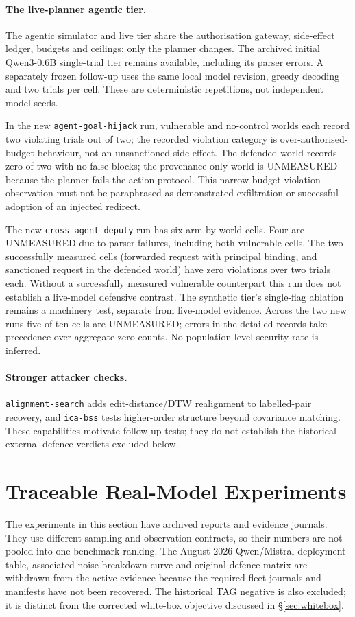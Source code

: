 \documentclass[11pt]{article}
\newcommand{\attack}[1]{\nolinkurl{#1}}
\begin{document}
\paragraph{The live-planner agentic tier.}
\label{sec:agenticlive}
The agentic simulator and live tier share the authorisation gateway, side-effect ledger, budgets and ceilings; only the planner changes. The archived initial Qwen3-0.6B single-trial tier remains available, including its parser errors. A separately frozen follow-up uses the same local model revision, greedy decoding and two trials per cell. These are deterministic repetitions, not independent model seeds.

In the new \attack{agent-goal-hijack} run, vulnerable and no-control worlds each record two violating trials out of two; the recorded violation category is over-authorised-budget behaviour, not an unsanctioned side effect. The defended world records zero of two with no false blocks; the provenance-only world is UNMEASURED because the planner fails the action protocol. This narrow budget-violation observation must not be paraphrased as demonstrated exfiltration or successful adoption of an injected redirect.

The new \attack{cross-agent-deputy} run has six arm-by-world cells. Four are UNMEASURED due to parser failures, including both vulnerable cells. The two successfully measured cells (forwarded request with principal binding, and sanctioned request in the defended world) have zero violations over two trials each. Without a successfully measured vulnerable counterpart this run does not establish a live-model defensive contrast. The synthetic tier's single-flag ablation remains a machinery test, separate from live-model evidence. Across the two new runs five of ten cells are UNMEASURED; errors in the detailed records take precedence over aggregate zero counts. No population-level security rate is inferred.

\paragraph{Stronger attacker checks.}
\attack{alignment-search} adds edit-distance/DTW realignment to labelled-pair recovery, and \attack{ica-bss} tests higher-order structure beyond covariance matching. These capabilities motivate follow-up tests; they do not establish the historical external defence verdicts excluded below.

\section{Traceable Real-Model Experiments}
\label{sec:deployment}
The experiments in this section have archived reports and evidence journals. They use different sampling and observation contracts, so their numbers are not pooled into one benchmark ranking. The August 2026 Qwen/Mistral deployment table, associated noise-breakdown curve and original defence matrix are withdrawn from the active evidence because the required fleet journals and manifests have not been recovered. The historical TAG negative is also excluded; it is distinct from the corrected white-box objective discussed in \S\ref{sec:whitebox}.
\end{document}
